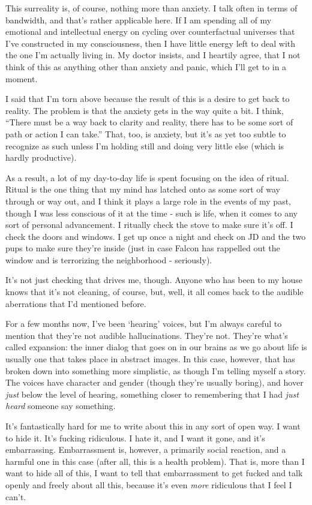 \begin{leftcolumn}
This surreality is, of course, nothing more than anxiety. I talk often in terms of bandwidth, and that's rather applicable here. If I am spending all of my emotional and intellectual energy on cycling over counterfactual universes that I've constructed in my consciousness, then I have little energy left to deal with the one I'm actually living in. My doctor insists, and I heartily agree, that I not think of this as anything other than anxiety and panic, which I'll get to in a moment.

I said that I'm torn above because the result of this is a desire to get back to reality. The problem is that the anxiety gets in the way quite a bit. I think, ``There must be a way back to clarity and reality, there has to be some sort of path or action I can take.'' That, too, is anxiety, but it's as yet too subtle to recognize as such unless I'm holding still and doing very little else (which is hardly productive).

As a result, a lot of my day-to-day life is spent focusing on the idea of ritual. Ritual is the one thing that my mind has latched onto as some sort of way through or way out, and I think it plays a large role in the events of my past, though I was less conscious of it at the time - such is life, when it comes to any sort of personal advancement. I ritually check the stove to make sure it's off. I check the doors and windows. I get up once a night and check on JD and the two pups to make sure they're inside (just in case Falcon has rappelled out the window and is terrorizing the neighborhood - seriously).

It's not just checking that drives me, though. Anyone who has been to my house knows that it's not cleaning, of course, but, well, it all comes back to the audible aberrations that I'd mentioned before.

For a few months now, I've been `hearing' voices, but I'm always careful to mention that they're not audible hallucinations. They're not. They're what's called expansion: the inner dialog that goes on in our brains as we go about life is usually one that takes place in abstract images. In this case, however, that has broken down into something more simplistic, as though I'm telling myself a story. The voices have character and gender (though they're usually boring), and hover \emph{just} below the level of hearing, something closer to remembering that I had \emph{just heard} someone say something.

It's fantastically hard for me to write about this in any sort of open way. I want to hide it. It's fucking ridiculous. I hate it, and I want it gone, and it's embarrassing. Embarrassment is, however, a primarily social reaction, and a harmful one in this case (after all, this is a health problem). That is, more than I want to hide all of this, I want to tell that embarrassment to get fucked and talk openly and freely about all this, because it's even \emph{more} ridiculous that I feel I can't.


\end{leftcolumn}
